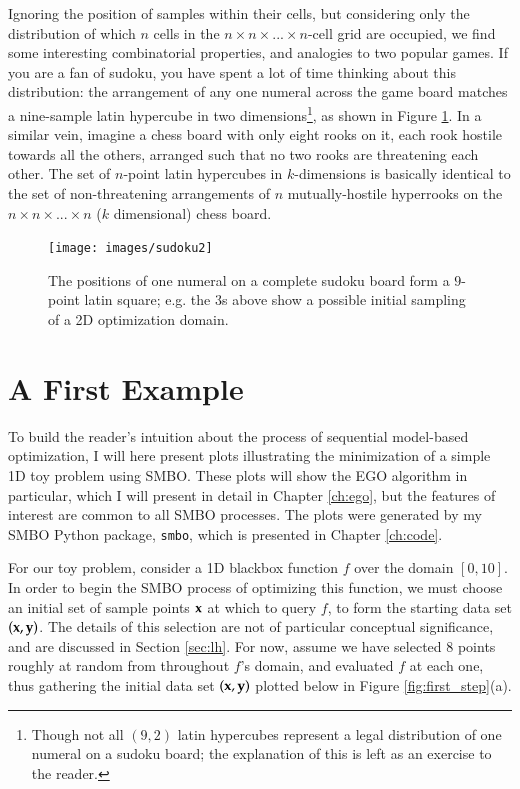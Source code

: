 Ignoring the position of samples within their cells, but considering only the distribution of which $n$ cells in the $n\times n \times...\times n$-cell grid are occupied, we find some interesting combinatorial properties, and analogies to two popular games. If you are a fan of sudoku, you have spent a lot of time thinking about this distribution: the arrangement  of any one numeral across the game board matches a nine-sample latin hypercube in two dimensions\footnote{Though not all $(9,2)$ latin hypercubes represent a legal distribution of one numeral on a sudoku board; the explanation of this is left as an exercise to the reader.}, as shown in Figure \ref{fig:sudoku}. In a similar vein, imagine a chess board with only eight rooks on it, each rook hostile towards all the others, arranged such that no two rooks are threatening each other. The set of $n$-point latin hypercubes in $k$-dimensions is basically identical to the set of non-threatening arrangements of $n$ mutually-hostile hyperrooks on the $n\times n \times...\times n$ ($k$ dimensional) chess board.

\begin{figure}[h]
\centering
\texttt{[image: images/sudoku2]}
\caption{The positions of one numeral on a complete sudoku board form a $9$-point latin square; e.g. the 3s above show a possible initial sampling of a 2D optimization domain. }
\label{fig:sudoku}
\end{figure}


\section{A First Example}\label{sec:smbo_ex}

To build the reader's intuition about the process of sequential model-based optimization, I will here present plots illustrating the minimization of a simple 1D toy problem using SMBO. These plots will show the EGO algorithm in particular, which I will present in detail in Chapter \ref{ch:ego}, but the features of interest are common to all SMBO processes. The plots were generated by my SMBO Python package, \texttt{smbo}, which is presented in Chapter \ref{ch:code}.

For our toy problem, consider a 1D blackbox function $f$ over the domain $[0,10]$. In order to begin the SMBO process of optimizing this function, we must choose an initial set of sample points $\mathbf{x}$ at which to query $f$, to form the starting data set $(\mathbf{x},\mathbf{y})$. The details of this selection are not of particular conceptual significance, and are discussed in Section \ref{sec:lh}. For now, assume we have selected 8 points roughly at random from throughout $f$'s domain, and evaluated $f$ at each one, thus gathering the initial data set $(\mathbf{x},\mathbf{y})$ plotted below in Figure \ref{fig:first_step}(a).



